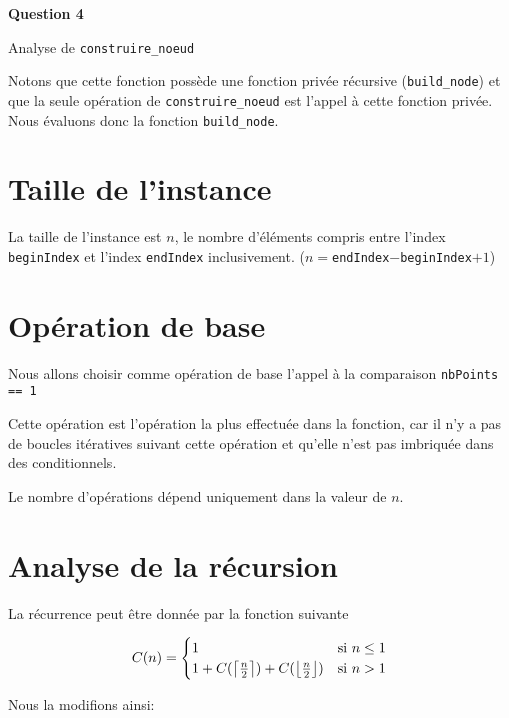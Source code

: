 \documentclass[class=article]{standalone}
\begin{document}
 
\centerline{\Huge \bf Question 4}

\centerline{Analyse de \lstinline{construire_noeud}}

Notons que cette fonction possède une fonction privée récursive (\lstinline{build_node}) 
et que la seule opération de \lstinline{construire_noeud}
est l'appel à cette fonction privée. Nous évaluons donc la fonction \lstinline{build_node}.

\section*{Taille de l'instance}

La taille de l'instance est $n$, le nombre d'éléments compris entre
l'index \lstinline{beginIndex} et l'index \lstinline{endIndex} 
inclusivement. ($n = $\lstinline{endIndex}$-$\lstinline{beginIndex}$+1$)

\section*{Opération de base}

Nous allons choisir comme opération de base l'appel à la comparaison \lstinline{nbPoints == 1}

Cette opération est l'opération la plus effectuée dans la fonction, car il n'y a pas de boucles 
itératives suivant cette opération et qu'elle n'est pas imbriquée dans des conditionnels.

Le nombre d'opérations dépend uniquement dans la valeur de $n$.

\section*{Analyse de la récursion}

La récurrence peut être donnée par la fonction suivante

\[
  C(n) =
  \begin{cases}
    1 & \text{si } n \leq 1 \\
    1 + C(\left \lceil \frac{n}{2} \right \rceil) + C(\left \lfloor \frac{n}{2} \right \rfloor)  & \text{si } n > 1 \\
  \end{cases}
\]

Nous la modifions ainsi:
\end{document}
